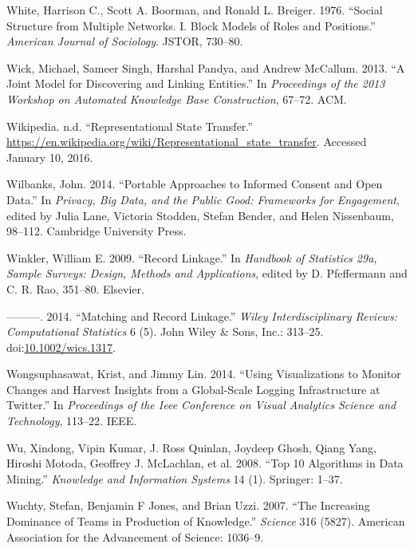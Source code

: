 \documentclass[]{krantz}
\begin{document}
\hypertarget{ref-white1976social}{}
White, Harrison C., Scott A. Boorman, and Ronald L. Breiger. 1976.
``Social Structure from Multiple Networks. I. Block Models of Roles and
Positions.'' \emph{American Journal of Sociology}. JSTOR, 730--80.

\hypertarget{ref-wick2013joint}{}
Wick, Michael, Sameer Singh, Harshal Pandya, and Andrew McCallum. 2013.
``A Joint Model for Discovering and Linking Entities.'' In
\emph{Proceedings of the 2013 Workshop on Automated Knowledge Base
Construction}, 67--72. ACM.

\hypertarget{ref-RESTwiki}{}
Wikipedia. n.d. ``Representational State Transfer.''
\url{https://en.wikipedia.org/wiki/Representational_state_transfer}.
Accessed January 10, 2016.

\hypertarget{ref-Wilbanks2014}{}
Wilbanks, John. 2014. ``Portable Approaches to Informed Consent and Open
Data.'' In \emph{Privacy, Big Data, and the Public Good: Frameworks for
Engagement}, edited by Julia Lane, Victoria Stodden, Stefan Bender, and
Helen Nissenbaum, 98--112. Cambridge University Press.

\hypertarget{ref-winkler09}{}
Winkler, William E. 2009. ``Record Linkage.'' In \emph{Handbook of
Statistics 29a, Sample Surveys: Design, Methods and Applications},
edited by D. Pfeffermann and C. R. Rao, 351--80. Elsevier.

\hypertarget{ref-WICS:WICS1317}{}
---------. 2014. ``Matching and Record Linkage.'' \emph{Wiley
Interdisciplinary Reviews: Computational Statistics} 6 (5). John Wiley
\& Sons, Inc.: 313--25.
doi:\href{https://doi.org/10.1002/wics.1317}{10.1002/wics.1317}.

\hypertarget{ref-wongsuphasawat2014using}{}
Wongsuphasawat, Krist, and Jimmy Lin. 2014. ``Using Visualizations to
Monitor Changes and Harvest Insights from a Global-Scale Logging
Infrastructure at Twitter.'' In \emph{Proceedings of the Ieee Conference
on Visual Analytics Science and Technology}, 113--22. IEEE.

\hypertarget{ref-wu2008top}{}
Wu, Xindong, Vipin Kumar, J. Ross Quinlan, Joydeep Ghosh, Qiang Yang,
Hiroshi Motoda, Geoffrey J. McLachlan, et al. 2008. ``Top 10 Algorithms
in Data Mining.'' \emph{Knowledge and Information Systems} 14 (1).
Springer: 1--37.

\hypertarget{ref-wuchty2007increasing}{}
Wuchty, Stefan, Benjamin F Jones, and Brian Uzzi. 2007. ``The Increasing
Dominance of Teams in Production of Knowledge.'' \emph{Science} 316
(5827). American Association for the Advancement of Science: 1036--9.
\end{document}
